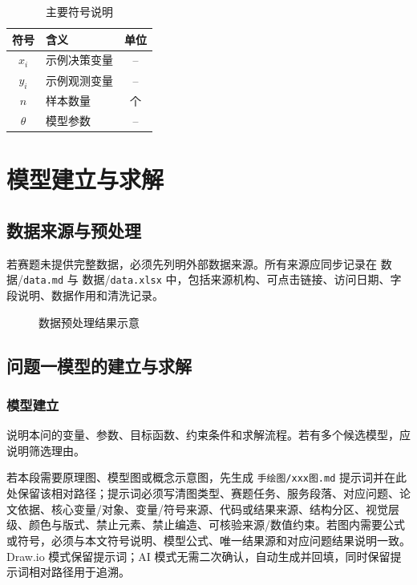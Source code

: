 \documentclass[12pt,a4paper]{article}
\begin{document}
\begin{table}[H]
    \centering
    \caption{主要符号说明}
    \begin{tabular}{clc}
        \toprule
        符号 & 含义 & 单位 \\
        \midrule
        $x_i$ & 示例决策变量 & -- \\
        $y_i$ & 示例观测变量 & -- \\
        $n$ & 样本数量 & 个 \\
        $\theta$ & 模型参数 & -- \\
        \bottomrule
    \end{tabular}
\end{table}

\section{模型建立与求解}

\subsection{数据来源与预处理}

若赛题未提供完整数据，必须先列明外部数据来源。所有来源应同步记录在 数据/\texttt{data.md} 与 数据/\texttt{data.xlsx} 中，包括来源机构、可点击链接、访问日期、字段说明、数据作用和清洗记录。

\begin{figure}[H]
    \centering
    \caption{数据预处理结果示意}
    \label{fig:data-preprocess}
\end{figure}

\subsection{问题一模型的建立与求解}

\subsubsection{模型建立}

说明本问的变量、参数、目标函数、约束条件和求解流程。若有多个候选模型，应说明筛选理由。

若本段需要原理图、模型图或概念示意图，先生成 \texttt{手绘图/xxx图.md} 提示词并在此处保留该相对路径；提示词必须写清图类型、赛题任务、服务段落、对应问题、论文依据、核心变量/对象、变量/符号来源、代码或结果来源、结构分区、视觉层级、颜色与版式、禁止元素、禁止编造、可核验来源/数值约束。若图内需要公式或符号，必须与本文符号说明、模型公式、唯一结果源和对应问题结果说明一致。Draw.io 模式保留提示词；AI 模式无需二次确认，自动生成并回填，同时保留提示词相对路径用于追溯。
\end{document}
